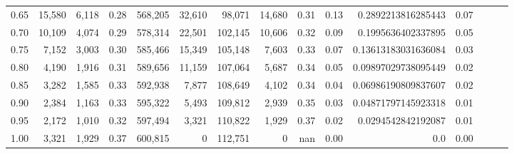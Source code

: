 \begin{tabular}{rrrrrrrrrrrrrrr}
0.65 &  15,580 &   6,118 &  0.28 &  568,205 &   32,610 &   98,071 &   14,680 &  0.31 &  0.13 &   0.2892213816285443 &      0.07 \\
0.70 &  10,109 &   4,074 &  0.29 &  578,314 &   22,501 &  102,145 &   10,606 &  0.32 &  0.09 &   0.1995636402337895 &      0.05 \\
0.75 &   7,152 &   3,003 &  0.30 &  585,466 &   15,349 &  105,148 &    7,603 &  0.33 &  0.07 &  0.13613183031636084 &      0.03 \\
0.80 &   4,190 &   1,916 &  0.31 &  589,656 &   11,159 &  107,064 &    5,687 &  0.34 &  0.05 &  0.09897029738095449 &      0.02 \\
0.85 &   3,282 &   1,585 &  0.33 &  592,938 &    7,877 &  108,649 &    4,102 &  0.34 &  0.04 &  0.06986190809837607 &      0.02 \\
0.90 &   2,384 &   1,163 &  0.33 &  595,322 &    5,493 &  109,812 &    2,939 &  0.35 &  0.03 &  0.04871797145923318 &      0.01 \\
0.95 &   2,172 &   1,010 &  0.32 &  597,494 &    3,321 &  110,822 &    1,929 &  0.37 &  0.02 &   0.0294542842192087 &      0.01 \\
1.00 &   3,321 &   1,929 &  0.37 &  600,815 &        0 &  112,751 &        0 &   nan &  0.00 &                  0.0 &      0.00 \\
\bottomrule
\end{tabular}
